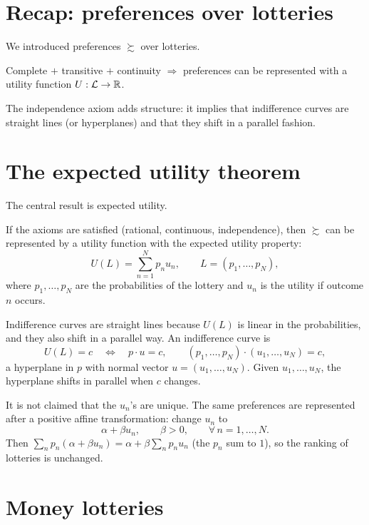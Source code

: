 \documentclass[11pt]{article}
\begin{document}


\section{Recap: preferences over lotteries}

We introduced preferences $\succsim$ over lotteries.
\begin{flatlist}
  \item Complete $+$ transitive $+$ continuity $\Rightarrow$ preferences can be
        represented with a utility function $U:\mathcal{L}\to\mathbb{R}$.
  \item The independence axiom adds structure: it implies that indifference curves
        are straight lines (or hyperplanes) and that they shift in a parallel
        fashion.
\end{flatlist}


\section{The expected utility theorem}

The central result is expected utility.

If the axioms are satisfied (rational, continuous, independence), then $\succsim$ can
be represented by a utility function with the expected utility property:
\[ U(L)=\sum_{n=1}^{N}p_n u_n, \qquad L=(p_1,\dots,p_N), \]
where $p_1,\dots,p_N$ are the probabilities of the lottery and $u_n$ is the utility if
outcome $n$ occurs.

 Indifference curves are straight lines because $U(L)$ is
linear in the probabilities, and they also shift in a parallel way. An indifference
curve is
\[ U(L)=c \quad\Longleftrightarrow\quad p\cdot u=c, \qquad
   (p_1,\dots,p_N)\cdot(u_1,\dots,u_N)=c, \]
a hyperplane in $p$ with normal vector $u=(u_1,\dots,u_N)$. Given $u_1,\dots,u_N$, the
hyperplane shifts in parallel when $c$ changes.

 It is not claimed that the $u_n$'s are unique. The same preferences are
represented after a positive affine transformation: change $u_n$ to
\[ \alpha+\beta u_n, \qquad \beta>0, \qquad \forall\, n=1,\dots,N. \]
Then $\sum_n p_n(\alpha+\beta u_n)=\alpha+\beta\sum_n p_n u_n$ (the $p_n$ sum to $1$),
so the ranking of lotteries is unchanged.


\section{Money lotteries}
\end{document}
